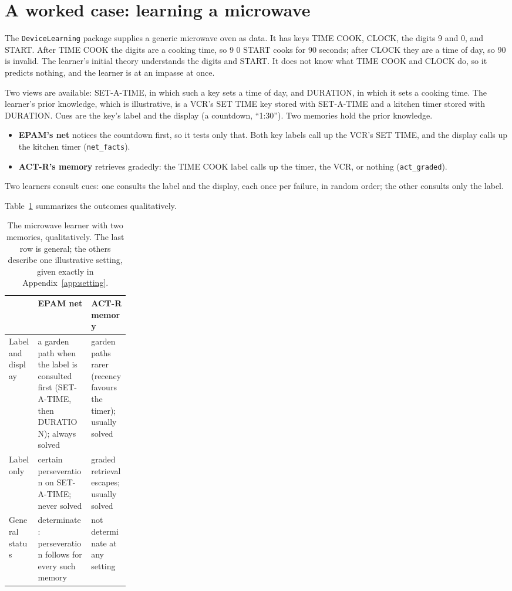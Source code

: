 \documentclass[11pt]{article}
\newcommand{\code}[1]{\texttt{#1}}
\newcommand{\lean}[1]{\texttt{#1}}
\begin{document}
\section{A worked case: learning a microwave}
\label{sec:case}

The \code{DeviceLearning} package supplies a generic microwave oven as data. It has keys TIME COOK, CLOCK, the digits 9 and 0, and START. After TIME COOK the digits are a cooking time, so 9 0 START cooks for 90 seconds; after CLOCK they are a time of day, so 90 is invalid. The learner's initial theory understands the digits and START. It does not know what TIME COOK and CLOCK do, so it predicts nothing, and the learner is at an impasse at once.

Two views are available: SET-A-TIME, in which such a key sets a time of day, and DURATION, in which it sets a cooking time. The learner's prior knowledge, which is illustrative, is a VCR's SET TIME key stored with SET-A-TIME and a kitchen timer stored with DURATION. Cues are the key's label and the display (a countdown, ``1:30''). Two memories hold the prior knowledge.
\begin{itemize}
  \item \textbf{EPAM's net} notices the countdown first, so it tests only that. Both key labels call up the VCR's SET TIME, and the display calls up the kitchen timer (\lean{net\_facts}).
  \item \textbf{ACT-R's memory} retrieves gradedly: the TIME COOK label calls up the timer, the VCR, or nothing (\lean{act\_graded}).
\end{itemize}
Two learners consult cues: one consults the label and the display, each once per failure, in random order; the other consults only the label.

Table~\ref{tab:qual} summarizes the outcomes qualitatively.

\begin{table}[t]
\centering
\small
\begin{tabularx}{\linewidth}{@{}>{\raggedright\arraybackslash}p{0.24\linewidth}>{\raggedright\arraybackslash}X>{\raggedright\arraybackslash}X@{}}
\toprule
& EPAM net & ACT-R memory \\
\midrule
Label and display & a garden path when the label is consulted first (SET-A-TIME, then DURATION); always solved & garden paths rarer (recency favours the timer); usually solved \\
Label only & certain perseveration on SET-A-TIME; never solved & graded retrieval escapes; usually solved \\
General status & determinate: perseveration follows for every such memory & not determinate at any setting \\
\bottomrule
\end{tabularx}
\caption{The microwave learner with two memories, qualitatively. The last row is general; the others describe one illustrative setting, given exactly in Appendix~\ref{app:setting}.}
\label{tab:qual}
\end{table}
\end{document}
